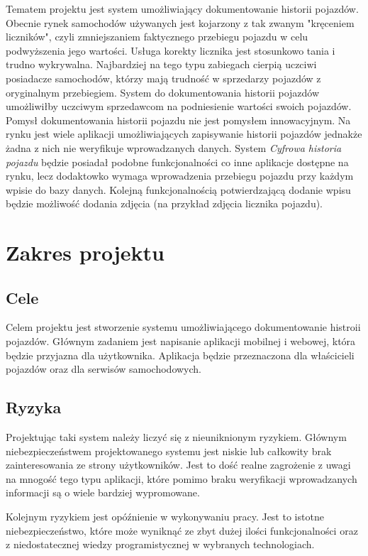 \documentclass[12pt]{article}
\begin{document}
Tematem projektu jest system umożliwiający dokumentowanie historii pojazdów. Obecnie rynek samochodów używanych jest kojarzony z tak zwanym "kręceniem liczników", czyli zmniejszaniem faktycznego przebiegu pojazdu w celu podwyższenia jego wartości. Usługa korekty licznika jest stosunkowo tania i trudno wykrywalna. Najbardziej na tego typu zabiegach cierpią uczciwi posiadacze samochodów, którzy mają trudność w sprzedarzy pojazdów z oryginalnym przebiegiem. System do dokumentowania historii pojazdów umożliwiłby uczciwym sprzedawcom na podniesienie wartości swoich pojazdów. Pomysł dokumentowania historii pojazdu nie jest pomysłem innowacyjnym. Na rynku jest wiele aplikacji umożliwiających zapisywanie historii pojazdów jednakże żadna z nich nie weryfikuje wprowadzanych danych. System\textit{ Cyfrowa historia pojazdu} będzie posiadał podobne funkcjonalności co inne aplikacje dostępne na rynku, lecz dodaktowko wymaga wprowadzenia przebiegu pojazdu przy każdym wpisie do bazy danych. Kolejną funkcjonalnością potwierdzającą dodanie wpisu będzie możliwość dodania zdjęcia (na przykład zdjęcia licznika pojazdu).




\newpage
\section{Zakres projektu}
\subsection{Cele}
Celem projektu jest stworzenie systemu umożliwiającego dokumentowanie histroii pojazdów. Głównym zadaniem jest napisanie aplikacji mobilnej i webowej, która będzie przyjazna dla użytkownika. Aplikacja będzie przeznaczona dla właścicieli pojazdów oraz dla serwisów samochodowych. 
\subsection{Ryzyka}
Projektując taki system należy liczyć się z nieuniknionym ryzykiem. Głównym niebezpieczeństwem projektowanego systemu jest niskie lub całkowity brak zainteresowania ze strony użytkowników. Jest to dość realne zagrożenie z uwagi na mnogość tego typu aplikacji, które pomimo braku weryfikacji wprowadzanych informacji są o wiele bardziej wypromowane. 

Kolejnym ryzykiem jest opóźnienie w wykonywaniu pracy. Jest to istotne niebezpieczeństwo, które może wyniknąć ze zbyt dużej ilości funkcjonalności oraz z niedostatecznej wiedzy programistycznej w wybranych technologiach. 
\end{document}

